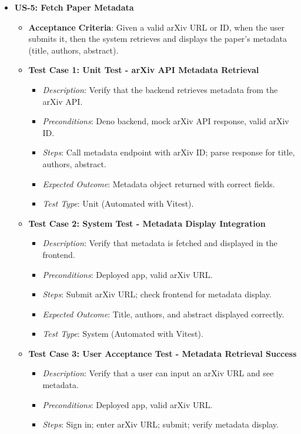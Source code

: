 \documentclass[12pt]{article}
\begin{document}
\begin{itemize}
  \item \textbf{US-5: Fetch Paper Metadata}
    \begin{itemize}
      \item \textbf{Acceptance Criteria}: Given a valid arXiv URL or ID, when the user submits it, then the system retrieves and displays the paper's metadata (title, authors, abstract).
      \item \textbf{Test Case 1: Unit Test - arXiv API Metadata Retrieval}
        \begin{itemize}
          \item \textit{Description}: Verify that the backend retrieves metadata from the arXiv API.
          \item \textit{Preconditions}: Deno backend, mock arXiv API response, valid arXiv ID.
          \item \textit{Steps}: Call metadata endpoint with arXiv ID; parse response for title, authors, abstract.
          \item \textit{Expected Outcome}: Metadata object returned with correct fields.
          \item \textit{Test Type}: Unit (Automated with Vitest).
        \end{itemize}
      \item \textbf{Test Case 2: System Test - Metadata Display Integration}
        \begin{itemize}
          \item \textit{Description}: Verify that metadata is fetched and displayed in the frontend.
          \item \textit{Preconditions}: Deployed app, valid arXiv URL.
          \item \textit{Steps}: Submit arXiv URL; check frontend for metadata display.
          \item \textit{Expected Outcome}: Title, authors, and abstract displayed correctly.
          \item \textit{Test Type}: System (Automated with Vitest).
        \end{itemize}
      \item \textbf{Test Case 3: User Acceptance Test - Metadata Retrieval Success}
        \begin{itemize}
          \item \textit{Description}: Verify that a user can input an arXiv URL and see metadata.
          \item \textit{Preconditions}: Deployed app, valid arXiv URL.
          \item \textit{Steps}: Sign in; enter arXiv URL; submit; verify metadata display.

\end{itemize}
\end{itemize}
\end{itemize}
\end{document}
